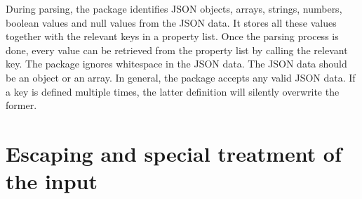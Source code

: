 \documentclass[a4paper]{article}
\begin{document}
During parsing, the package identifies JSON objects, arrays, strings, numbers, boolean values and null values from the JSON data. It stores all these values together with the relevant keys in a property list. Once the parsing process is done, every value can be retrieved from the property list by calling the relevant key. The package ignores whitespace in the JSON data. The JSON data should be an object or an array. In general, the package accepts any valid JSON data. If a key is defined multiple times, the latter definition will silently overwrite the former.

\section{Escaping and special treatment of the input}\label{sec:escaping}
\end{document}
